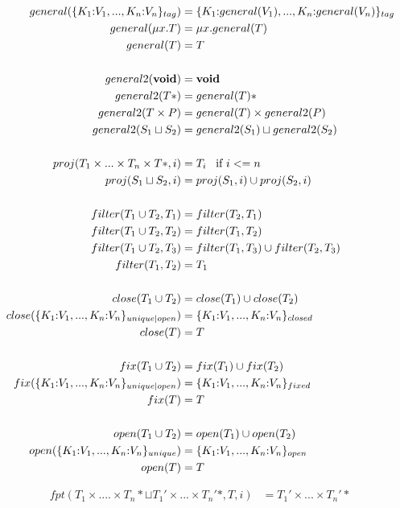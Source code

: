 \begin{align*}
general(\{K_{1}{:}V_{1}, ..., K_{n}{:}V_{n}\}_{tag}) & = \{K_{1}{:}general(V_{1}), ..., K_{n}{:}general(V_{n})\}_{tag}\\
general(\mu x.T) & = \mu x.general(T)\\
general(T) & = T\\
\\
general2(\mathbf{void}) & = \mathbf{void}\\
general2(T{*}) & = general(T){*}\\
general2(T \times P) & = general(T) \times general2(P)\\
general2(S_{1} \sqcup S_{2}) & = general2(S_{1}) \sqcup general2(S_{2})
\\ \\
proj(T_{1} \times ... \times T_{n} \times T{*}, i) & =  T_{i} \;\;\; \text{if $i <= n$}\\
proj(S_{1} \sqcup S_{2}, i) & = proj(S_{1}, i) \cup proj(S_{2}, i)
\\ \\
filter(T_{1} \cup T_{2}, T_{1}) & = filter(T_{2}, T_{1})\\
filter(T_{1} \cup T_{2}, T_{2}) & = filter(T_{1}, T_{2})\\
filter(T_{1} \cup T_{2}, T_{3}) & = filter(T_{1}, T_{3}) \cup filter(T_{2}, T_{3})\\
filter(T_{1}, T_{2}) & = T_{1}
\\ \\
close(T_{1} \cup T_{2}) & = close(T_{1}) \cup close(T_{2})\\
close(\{K_{1}{:}V_{1}, ..., K_{n}{:}V_{n}\}_{unique|open}) & = \{K_{1}{:}V_{1}, ..., K_{n}{:}V_{n}\}_{closed} \\
close(T) & = T
\\ \\
fix(T_{1} \cup T_{2}) & = fix(T_{1}) \cup fix(T_{2})\\
fix(\{K_{1}{:}V_{1}, ..., K_{n}{:}V_{n}\}_{unique|open}) & = \{K_{1}{:}V_{1}, ..., K_{n}{:}V_{n}\}_{fixed} \\
fix(T) & = T
\\ \\
open(T_{1} \cup T_{2}) & = open(T_{1}) \cup open(T_{2})\\
open(\{K_{1}{:}V_{1}, ..., K_{n}{:}V_{n}\}_{unique}) & = \{K_{1}{:}V_{1}, ..., K_{n}{:}V_{n}\}_{open} \\
open(T) & = T
\end{align*}

\begin{align*}
fpt(T_{1} \times .... \times T_{n}{*} \sqcup T_{1}' \times ... \times T_{n}'{*}, T, i) & = T_{1}' \times ... \times T_{n}'{*}
\end{align*}

